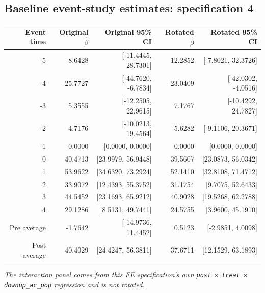 \documentclass[10pt]{article}
\begin{document}
\subsection*{Baseline event-study estimates: specification 4}
\begin{center}
\scriptsize
\begin{tabular}{r rr rr}
\toprule
Event time & Original $\hat\beta$ & Original 95\% CI & Rotated $\hat\beta$ & Rotated 95\% CI \\
\midrule
-5 & 8.6428 & [-11.4445, 28.7301] & 12.2852 & [-7.8021, 32.3726] \\
-4 & -25.7727 & [-44.7620, -6.7834] & -23.0409 & [-42.0302, -4.0516] \\
-3 & 5.3555 & [-12.2505, 22.9615] & 7.1767 & [-10.4292, 24.7827] \\
-2 & 4.7176 & [-10.0213, 19.4564] & 5.6282 & [-9.1106, 20.3671] \\
-1 & 0.0000 & [0.0000, 0.0000] & 0.0000 & [0.0000, 0.0000] \\
0 & 40.4713 & [23.9979, 56.9448] & 39.5607 & [23.0873, 56.0342] \\
1 & 53.9622 & [34.6320, 73.2924] & 52.1410 & [32.8108, 71.4712] \\
2 & 33.9072 & [12.4393, 55.3752] & 31.1754 & [9.7075, 52.6433] \\
3 & 44.5452 & [23.1693, 65.9212] & 40.9028 & [19.5268, 62.2788] \\
4 & 29.1286 & [8.5131, 49.7441] & 24.5755 & [3.9600, 45.1910] \\
\midrule
Pre average & -1.7642 & [-14.9736, 11.4452] & 0.5123 & [-2.9851, 4.0098] \\
Post average & 40.4029 & [24.4247, 56.3811] & 37.6711 & [12.1529, 63.1893] \\
\bottomrule
\end{tabular}
\end{center}
\medskip
\textit{The interaction panel comes from this FE specification's own \texttt{post} $\times$ \texttt{treat} $\times$ \texttt{downup\_ac\_pop} regression and is not rotated.}
\clearpage
\end{document}

